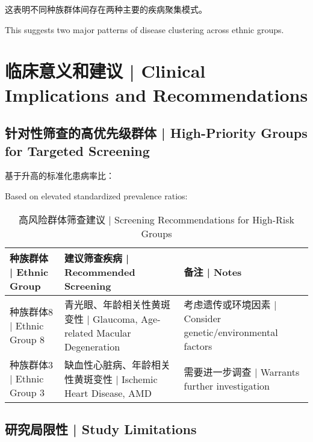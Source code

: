 \documentclass[12pt,a4paper]{article}
\begin{document}
这表明不同种族群体间存在两种主要的疾病聚集模式。

This suggests two major patterns of disease clustering across ethnic groups.

\section{临床意义和建议 | Clinical Implications and Recommendations}

\subsection{针对性筛查的高优先级群体 | High-Priority Groups for Targeted Screening}

基于升高的标准化患病率比：

Based on elevated standardized prevalence ratios:

\begin{table}[H]
\centering
\caption{高风险群体筛查建议 | Screening Recommendations for High-Risk Groups}
\begin{tabular}{@{}p{4cm}p{6cm}p{4cm}@{}}
\toprule
\textbf{种族群体 | Ethnic Group} & \textbf{建议筛查疾病 | Recommended Screening} & \textbf{备注 | Notes} \\
\midrule
种族群体8 | Ethnic Group 8 & 青光眼、年龄相关性黄斑变性 | Glaucoma, Age-related Macular Degeneration & 考虑遗传或环境因素 | Consider genetic/environmental factors \\
\midrule
种族群体3 | Ethnic Group 3 & 缺血性心脏病、年龄相关性黄斑变性 | Ischemic Heart Disease, AMD & 需要进一步调查 | Warrants further investigation \\
\bottomrule
\end{tabular}
\end{table}

\subsection{研究局限性 | Study Limitations}
\end{document}
